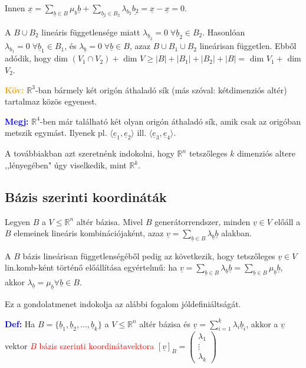 \documentclass[../szamtud.tex]{subfiles}
\begin{document}
        \noindent Innen $\underline{x} = \sum_{\underline{b} \in B} \mu_b \underline{b} + \sum_{\underline{b_2} \in B_2} \lambda_{b_2} \underline{b_2} = \underline{x} - \underline{x} = 0$. 
        
        \noindent A $B \cup B_2$ lineáris függetlensége miatt $\lambda_{\underline{b}_2} = 0 \; \forall \underline{b}_2 \in B_2$. Hasonlóan $\lambda_{b_1} = 0 \; \forall \underline{b}_1 \in B_1$, és $\lambda_{\underline{b}} = 0 \; \forall \underline{b} \in B$, azaz $B \cup B_1 \cup B_2$ lineárisan független. Ebből adódik, hogy dim $(V_1 \cap V_2)+$ dim $V \geq |B|+|B_1|+|B_2|+|B| =$ dim $V_1+$ dim $V_2$.

        \textcolor{orange}{\textbf{Köv:}} $\mathbb{R}^3$-ban bármely két origón áthaladó sík (más szóval: kétdimenziós altér) tartalmaz közös egyenest.
        
        \textcolor{blue}{\textbf{Megj:}} $\mathbb{R}^4$-ben már található két olyan origón áthaladó sík, amik csak az origóban metszik egymást. Ilyenek pl. $\langle \underline{e}_1, \underline{e}_2 \rangle$ ill. $\langle \underline{e}_3, \underline{e}_4 \rangle$.

        A továbbiakban azt szeretnénk indokolni, hogy $\mathbb{R}^n$ tetszőleges $k$ dimenziós altere ,,lényegében" úgy viselkedik, mint $\mathbb{R}^k$.

    \subsection{Bázis szerinti koordináták}

        Legyen $B$ a $V \leq \mathbb{R}^n$ altér bázisa. Mivel $B$ generátorrendszer, minden $\underline{v} \in V$ előáll a $B$ elemeinek lineáris kombinációjaként, azaz $\underline{v} = \sum_{\underline{b} \in B} \lambda_{\underline{b}}\underline{b}$ alakban.

        A $B$ bázis lineárisan függetlenségéből pedig az következik, hogy tetszőleges $\underline{v} \in V$ lin.komb-ként történő előállítása egyértelmű: ha $\underline{v} = \sum_{\underline{b} \in B} \lambda_{\underline{b}}\underline{b} = \sum_{\underline{b} \in B} \mu_{\underline{b}}\underline{b}$, akkor $\lambda_{\underline{b}} = \mu_{\underline{b}} \forall \underline{b} \in B$. 
        
        Ez a gondolatmenet indokolja az alábbi fogalom jóldefiniáltságát.

        \textcolor{blue}{\textbf{Def:}} Ha $B = \{\underline{b}_1, \underline{b}_2, \dots, \underline{b}_k\}$ a $V \leq \mathbb{R}^n$ altér bázisa és $\underline{v} = \sum_{i=1}^{k} \lambda_i \underline{b}_i$, akkor a $\underline{v}$ vektor \textcolor{red}{$B$ bázis szerinti koordinátavektora} $[\underline{v}]_B = \begin{pmatrix} \lambda_1 \\ \vdots \\ \lambda_k\end{pmatrix}$
\end{document}

